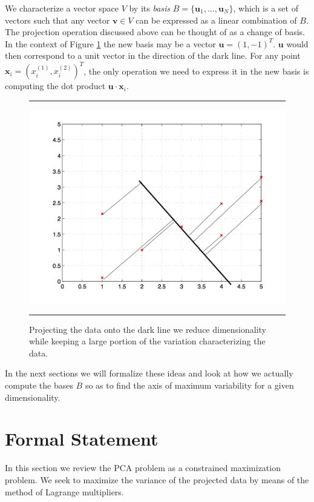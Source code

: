 \documentclass[11pt, oneside, a4paper]{report}
\begin{document}
We characterize a vector space $V$ by its \emph{basis} $B=\{\mathbf{u}_1,...,\mathbf{u}_N\}$, which is a set
of vectors such that any vector $\mathbf{v}\in V$ can be expressed as a linear
combination of $B$. The projection operation discussed above can be
thought of as a change of basis. In the context of Figure \ref{pca2}
the new basis may be a vector $\mathbf{u} = (1,-1)^T$. $\mathbf{u}$
would then correspond to a unit vector in the direction of the dark line. For any point $\mathbf{x}_i =
(x_i^{(1)}, x_i^{(2)})^T$, the only operation we need to express it in the new
basis is computing the dot product $\mathbf{u}\cdot \mathbf{x}_i$.


\begin{figure}
  \centering
  \hrule
  \includegraphics[width = .9\textwidth]{Figures/pca2.png}
  \hrule
  \caption{Projecting the data onto the dark line we reduce
    dimensionality while keeping a large portion of the variation
    characterizing the data.}
  \label{pca2}
\end{figure}

In the next sections we will formalize these ideas and look at how we
actually compute the bases $B$ so as to find the axis of maximum
variability for a given dimensionality. 

\section{Formal Statement}

In this section we review the PCA problem as a constrained
maximization problem. We seek to maximize the variance of the
projected data by means of the method of Lagrange multipliers. 
\end{document}
